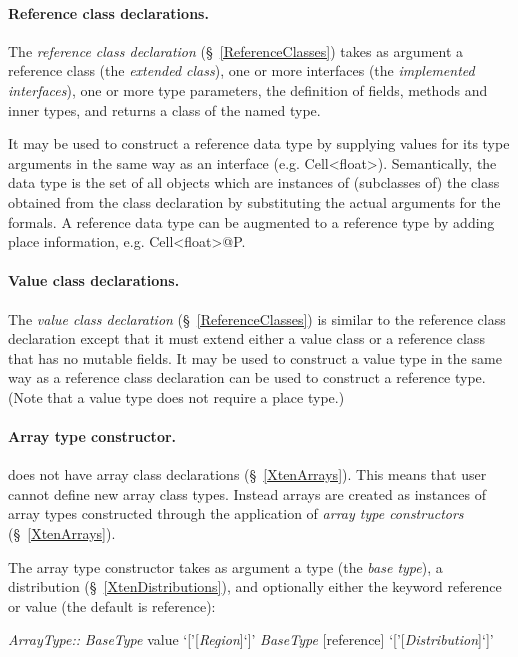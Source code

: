 \paragraph{Reference class declarations.}\label{ReferenceTypes}
The {\em reference class declaration} (\S~\ref{ReferenceClasses})
takes as argument a reference class (the {\em extended class}), one or
more interfaces (the {\em implemented interfaces}), one or more type
parameters, the definition of fields, methods and inner types, and
returns a class of the named type.  

It may be used to construct a reference data type by supplying values
for its type arguments in the same way as an interface (e.g.{} {\cf
Cell<float>}). Semantically, the data type is the set of all objects
which are instances of (subclasses of) the class obtained from the
class declaration by substituting the actual arguments for the
formals.  A reference data type can be augmented to a reference type
by adding place information, e.g. {\cf Cell<float>@P}.

\paragraph{Value class declarations.}
The {\em value class declaration} (\S~\ref{ReferenceClasses}) is
similar to the reference class declaration except that it must extend
either a value class or a reference class that has no mutable
fields. 
It may be used to construct a value type in the same way as a
reference class declaration can be used to construct a reference
type. (Note that a value type does not require a place type.)

\paragraph{Array type constructor.}

{}\XtenCurrVer{} does not have array class declarations
(\S~\ref{XtenArrays}). This means that user cannot define new array
class types. Instead arrays are created as instances of array types
constructed through the application of {\em array type constructors}
(\S~\ref{XtenArrays}).

The array type constructor takes as argument a type (the {\em
base type}), a distribution (\S~\ref{XtenDistributions}), and
optionally either the keyword {\cf reference} or {\cf value}
(the default is reference):
\begin{x10}
{\em{}ArrayType::}
 {\em{}BaseType} value `['[{\em{}Region}]`]'
 {\em{}BaseType} [reference] `['[{\em{}Distribution}]`]'
\end{x10}

